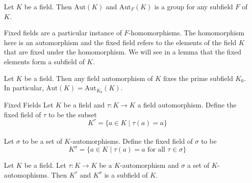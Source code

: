 \documentclass[a4paper]{article}
\begin{document}
\begin{lmm}{}{} Let $K$ be a field. Then $\text{Aut}(K)$ and $\text{Aut}_F(K)$ is a group for any subfield $F$ of $K$. 
\end{lmm}

Fixed fields are a particular instance of $F$-homomorphisms. The homomorphism here is an automorphism and the fixed field refers to the elements of the field $K$ that are fixed under the homomorphism. We will see in a lemma that the fixed elements form a subfield of $K$. 

\begin{prp}{}{} Let $K$ be a field. Then any field automorphism of $K$ fixes the prime subfield $K_0$. In particular, $\text{Aut}(K)=\text{Aut}_{K_0}(K)$. 
\end{prp}

\begin{defn}{Fixed Fields}{} Let $K$ be a field and $\tau:K\to K$ a field automorphism. Define the fixed field of $\tau$ to be the subset $$K^\tau=\{a\in K\;|\;\tau(a)=a\}$$~\\
Let $\sigma$ to be a set of $K$-automorphisms. Define the fixed field of $\sigma$ to be $$K^\sigma=\{a\in K\;|\;\tau(a)=a\text{ for all }\tau\in\sigma\}$$
\end{defn}

\begin{lmm}{}{} Let $K$ be a field. Let $\tau:K\to K$ be a $K$-automorphism and $\sigma$ a set of $K$-automophisms. Then $K^\tau$ and $K^\sigma$ is a subfield of $K$. 
\end{lmm}
\end{document}
